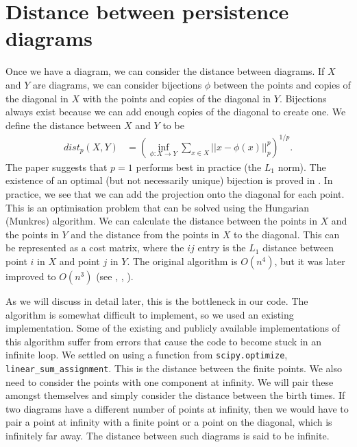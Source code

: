\documentclass[codesnippet]{jss}
\begin{document}
\section[Distance diagrams]{Distance between persistence diagrams}
Once we have a diagram, we can consider the distance between diagrams.  If $X$ and $Y$ are diagrams, we can consider bijections $\phi$ between the points and copies of the diagonal in $X$ with the points and copies of the diagonal in $Y$.  Bijections always exist because we can add enough copies of the diagonal to create one.  We define the distance between $X$ and $Y$ to be
\begin{align}
dist_p(X,Y) &= \left(\inf_{\phi: X \to Y}\sum_{x \in X} ||x - \phi(x)||_p^p\right)^{1/p}.
\end{align}
The paper suggests that $p=1$ performs best in practice (the $L_1$ norm).  The existence of an optimal (but not necessarily unique) bijection is proved in \cite{turn13}.    In practice, we see that we can add the projection onto the diagonal for each point.  This is an optimisation problem that can be solved using the Hungarian (Munkres) algorithm.  We can calculate the distance between the points in $X$ and the points in $Y$ and the distance from the points in $X$ to the diagonal.  This can be represented as a cost matrix, where the $ij$ entry is the $L_1$ distance between point $i$ in $X$ and point $j$ in $Y$.  The original algorithm is $O(n^4)$, but it was later improved to $O(n^3)$ (see \cite{kuhn55}, \cite{kuhn56}, \cite{munk57}).  

As we will discuss in detail later, this is the bottleneck in our code.  The algorithm is somewhat difficult to implement, so we used an existing implementation.  Some of the existing and publicly available implementations of this algorithm suffer from errors that cause the code to become stuck in an infinite loop.  We settled on using a function from \texttt{scipy.optimize}, \texttt{linear\_sum\_assignment}.  This is the distance between the finite points.  We also need to consider the points with one component at infinity.  We will pair these amongst themselves and simply consider the distance between the birth times.  If two diagrams have a different number of points at infinity, then we would have to pair a point at infinity with a finite point or a point on the diagonal, which is infinitely far away.  The distance between such diagrams is said to be infinite.  
\end{document}
